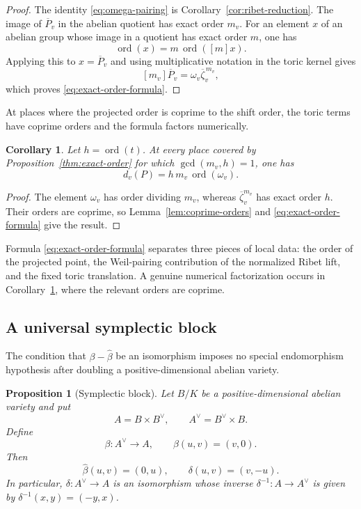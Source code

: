 \documentclass[11pt,letterpaper,reqno]{amsart}
\newtheorem{proposition}[theorem]{Proposition}
\newtheorem{corollary}[theorem]{Corollary}
\theoremstyle{definition}
\theoremstyle{remark}
\newcommand{\ord}{\operatorname{ord}}
\begin{document}
\begin{proof}
The identity \eqref{eq:omega-pairing} is
Corollary~\ref{cor:ribet-reduction}.  The image of $\overline P_v$ in the abelian
quotient has exact order $m_v$.  For an element $x$ of an abelian group whose
image in a quotient has exact order $m$, one has
\[
 \ord(x)=m\,\ord([m]x).
\]
Applying this to $x=\overline P_v$ and using multiplicative notation in the
toric kernel gives
\[
 [m_v]\overline P_v
 =\omega_v\overline\zeta_v^{\,m_v},
\]
which proves \eqref{eq:exact-order-formula}.
\end{proof}

At places where the projected order is coprime to the shift order, the toric
terms have coprime orders and the formula factors numerically.

\begin{corollary}
\label{cor:exact-coprime}
Let $h=\ord(t)$.  At every place covered by Proposition~\ref{thm:exact-order} for which
$\gcd(m_v,h)=1$, one has
\begin{equation}\label{eq:exact-coprime-formula}
 d_v(P)=h\,m_v\,\ord(\omega_v).
\end{equation}
\end{corollary}

\begin{proof}
The element $\omega_v$ has order dividing $m_v$, whereas
$\overline\zeta_v^{m_v}$ has exact order $h$.  Their orders are coprime, so
Lemma~\ref{lem:coprime-orders} and \eqref{eq:exact-order-formula} give the result.
\end{proof}

Formula \eqref{eq:exact-order-formula} separates three pieces of local data:
the order of the projected point, the Weil-pairing contribution of the
normalized Ribet lift, and the fixed toric translation.  A genuine numerical
factorization occurs in Corollary~\ref{cor:exact-coprime}, where the relevant orders are
coprime.

\subsection{A universal symplectic block}\label{sec:block}

The condition that $\beta-\widehat\beta$ be an isomorphism imposes no special
endomorphism hypothesis after doubling a positive-dimensional abelian variety.

\begin{proposition}[Symplectic block]\label{prop:block}
Let $B/K$ be a positive-dimensional abelian variety and put
\[
 A=B\times B^\vee,
 \qquad A^\vee=B^\vee\times B.
\]
Define
\[
 \beta:A^\vee\longrightarrow A,
 \qquad \beta(u,v)=(v,0).
\]
Then
\[
 \widehat\beta(u,v)=(0,u),
 \qquad
 \delta(u,v)=(v,-u).
\]
In particular, $\delta:A^\vee\to A$ is an isomorphism whose inverse
$\delta^{-1}:A\to A^\vee$ is given by
$\delta^{-1}(x,y)=(-y,x)$.
\end{proposition}
\end{document}
